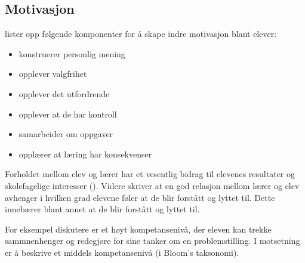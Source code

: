 \documentclass[main.tex]{subfiles}
\begin{document}
\subsection*{Motivasjon}

 lister opp følgende komponenter for å skape indre motivasjon blant elever:
\begin{itemize}
\item konstruerer personlig mening  
\item opplever valgfrihet
\item opplever det utfordrende
\item opplever at de har kontroll
\item samarbeider om oppgaver
\item opplærer at læring har konsekvenser
\end{itemize}

Forholdet mellom elev og lærer har et vesentlig bidrag til elevenes resultater og skolefagelige interesser ().
Videre skriver  at en god relasjon mellom lærer og elev avhenger i hvilken grad elevene føler at de blir
forstått og lyttet til. Dette innebærer blant annet at de blir forstått og lyttet til.

For eksempel diskutere er et høyt kompetansenivå, der eleven kan trekke sammnenhenger og redegjøre for sine tanker om en problemstilling. I motsetning er å beskrive et middels kompetansenivå (i Bloom's taksonomi).
\end{document}
